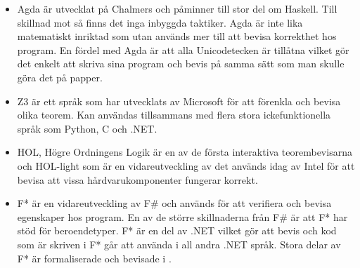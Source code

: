 \begin{itemize}
\item Agda är utvecklat på Chalmers och påminner till stor del om Haskell. Till
skillnad mot \coq så finns det inga inbyggda taktiker. Agda är inte lika
matematiskt inriktad som \coq utan används mer till att bevisa korrekthet hos
program. En fördel med Agda är att alla Unicodetecken är tillåtna vilket gör
det enkelt att skriva sina program och bevis på samma sätt som man skulle göra
det på papper.

\item Z3 är ett språk som har utvecklats av Microsoft för att förenkla och
bevisa olika teorem. Kan användas tillsammans med flera stora ickefunktionella
språk som Python, C och .NET.

\item HOL, Högre Ordningens Logik är en av de första interaktiva
teorembevisarna och HOL-light som är en vidareutveckling av det används idag av
Intel för att bevisa att vissa hårdvarukomponenter fungerar korrekt.

\item F* är en vidareutveckling av F\# och används för att verifiera och bevisa
egenskaper hos program. En av de större skillnaderna från F\# är att F* har
stöd för beroendetyper. F* är en del av .NET vilket gör att bevis och kod som
är skriven i F* går att använda i all andra .NET språk. Stora delar av F* är
formaliserade och bevisade i \coq.
\end{itemize}

\begin{comment}
Källor och annat material
HOL http://www.cl.cam.ac.uk/~jrh13/hol-light/
Z3 http://research.microsoft.com/en-us/um/redmond/projects/z3/old/
F* http://research.microsoft.com/en-us/projects/fstar/
\end{comment}
